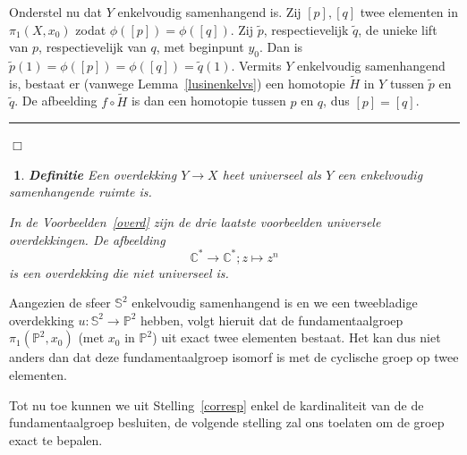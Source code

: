 \documentclass[12pt]{book}
\newcommand{\R}{\mathbb{R}}
\newcommand{\Z}{\mathbb{Z}}
\newcommand{\Sf}{\mathbb{S}}
\newcommand{\B}{\rule{1mm}{0mm} \hfill $\Box$ }
\newcommand{\C}{\mathbb{C}}
\newtheorem{dfh}[stelh]{$\!\!$}
\newenvironment{df}{\begin{dfh} \em {\bf Definitie }}{\end{dfh}}
\begin{document}
Onderstel nu dat $Y$ enkelvoudig samenhangend is. Zij $[p], [q]$ twee elementen in $\pi_{1}(X,x_0)$ zodat $\phi([p])=\phi([q])$. Zij $\widetilde{p}$, respectievelijk  $\widetilde{q}$, de unieke lift van $p$, respectievelijk van $q$, met beginpunt $y_0$. Dan is $\widetilde{p}(1)=\phi([p])=\phi([q])=\widetilde{q}(1)$. Vermits $Y$ enkelvoudig samenhangend is, bestaat er (vanwege Lemma~\ref{lusinenkelvs}) een homotopie $\widetilde{H}$ in $Y$ tussen $\widetilde{p}$ en $\widetilde{q}$.  De afbeelding $f\circ \widetilde{H}$ is dan een homotopie tussen $p$ en $q$, dus $[p]=[q]$. \B



\begin{df} Een overdekking $Y\to X$ heet {\em universeel} als $Y$ een enkelvoudig sa\-menhangende
ruimte is. 

In de Voorbeelden~\ref{overd} zijn de drie laatste voorbeelden universele overdekkingen. De afbeelding
$$\C^*\to \C^*; z\mapsto z^n$$
is een overdekking die niet universeel is.
\end{df}

Aangezien de sfeer $\Sf^2$ enkelvoudig samenhangend is en we een tweebladige overdekking $u: \Sf^2 \to \mathbb{P}^2$ hebben, volgt hieruit dat de fundamentaalgroep $\pi_1(\mathbb{P}^2, x_0)$ (met $x_0$ in $\mathbb{P}^2$) uit exact twee elementen bestaat. Het kan dus niet anders dan dat deze fundamentaalgroep isomorf is met de cyclische groep op twee elementen.

Tot nu toe kunnen we uit Stelling~\ref{corresp} enkel de kardinaliteit van de de fundamentaalgroep besluiten, de volgende stelling zal ons toelaten om de groep exact te bepalen.


%
\end{document}
